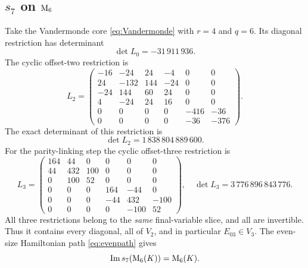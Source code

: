 \subsection{\texorpdfstring{$s_7$ on $\mathrm{M}_6$}{s7 on M6}}
Take the Vandermonde core \eqref{eq:Vandermonde} with
$r=4$ and $q=6$. Its diagonal restriction has determinant
\begin{equation}\label{eq:s7d0}
 \det L_0=-31\,911\,936.
\end{equation}
The cyclic offset-two restriction is
\begin{equation}\label{eq:s7mat2}
 L_2=\begin{pmatrix}
 -16&-24&24&-4&0&0\\
 24&-132&144&-24&0&0\\
 -24&144&60&24&0&0\\
 4&-24&24&16&0&0\\
 0&0&0&0&-416&-36\\
 0&0&0&0&-36&-376
 \end{pmatrix}.
\end{equation}
The exact determinant of this restriction is
\[\det L_2=1\,838\,804\,889\,600.\]
For the parity-linking step the cyclic offset-three restriction is
\begin{equation}\label{eq:s7mat3}
 L_3=\begin{pmatrix}
164&44&0&0&0&0\\
44&432&100&0&0&0\\
0&100&52&0&0&0\\
0&0&0&164&-44&0\\
0&0&0&-44&432&-100\\
0&0&0&0&-100&52
\end{pmatrix},
\quad\det L_3=3\,776\,896\,843\,776.
\end{equation}
All three restrictions belong to the \emph{same} final-variable
slice, and all are invertible. Thus it contains every diagonal,
all of $V_2$, and in particular $E_{03}\in V_3$. The even-size
Hamiltonian path \eqref{eq:evenpath} gives
\begin{equation}\label{eq:s7m6}
 \operatorname{Im} s_7(\mathrm{M}_6(K))=\mathrm{M}_6(K).
\end{equation}

